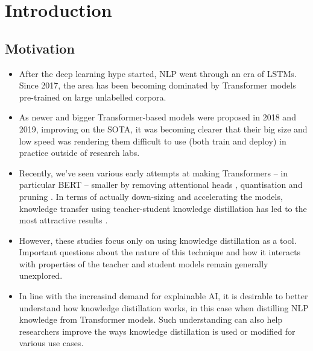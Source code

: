 \documentclass[bsc,frontabs,twoside,singlespacing,parskip,deptreport]{infthesis}
\begin{document}
\chapter{Introduction}{
  \section{Motivation}{
    \begin{itemize}
      \item After the deep learning hype started, NLP went through an era of LSTMs. Since 2017, the area has been becoming dominated by Transformer models pre-trained on large unlabelled corpora.
      \item As newer and bigger Transformer-based models were proposed in 2018 and 2019, improving on the SOTA, it was becoming clearer that their big size and low speed was rendering them difficult to use (both train and deploy) in practice outside of research labs.
      \item Recently, we've seen various early attempts at making Transformers -- in particular BERT \citep{Devlin_2018} -- smaller by removing attentional heads \citep{Michel_2019}, quantisation and pruning \citep{Cheong_2019, Sucik_2019}. In terms of actually down-sizing and accelerating the models, knowledge transfer using teacher-student knowledge distillation has led to the most attractive results \citep{Mukherjee_2019,Tang_2019a,Jiao_2019,Sanh_2019}.
      \item However, these studies focus only on using knowledge distillation as a tool. Important questions about the nature of this technique and how it interacts with properties of the teacher and student models remain generally unexplored.
      \item In line with the increasind demand for explainable AI, it is desirable to better understand how knowledge distillation works, in this case when distilling NLP knowledge from Transformer models. Such understanding can also help researchers improve the ways knowledge distillation is used or modified for various use cases.
    \end{itemize}
  }
  
}
\end{document}
